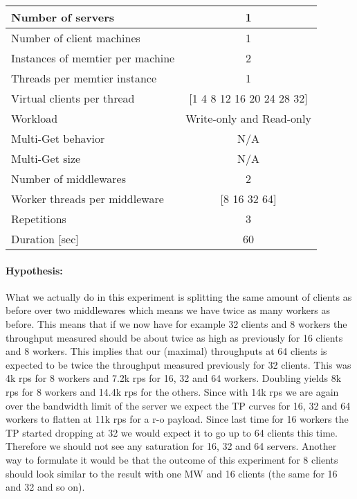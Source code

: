\documentclass[11pt,a4paper]{article}
\begin{document}
\begin{table}[!ht]
\begin{center}
	\scriptsize{
		\begin{tabular}{|l|c|}
			\hline Number of servers                & 1                        \\ 
			\hline Number of client machines        & 1                        \\ 
			\hline Instances of memtier per machine & 2                        \\ 
			\hline Threads per memtier instance     & 1                        \\
			\hline Virtual clients per thread       & [1 4 8 12 16 20 24 28 32]                  \\ 
			\hline Workload                         & Write-only and Read-only \\
			\hline Multi-Get behavior               & N/A                      \\
			\hline Multi-Get size                   & N/A                      \\
			\hline Number of middlewares            & 2                        \\
			\hline Worker threads per middleware    & [8 16 32 64]                  \\
			\hline Repetitions                      & 3               \\ 
			\hline Duration [sec]                      & 60              \\
			\hline 
		\end{tabular}
	} 
\end{center}
\end{table}

\paragraph{Hypothesis:} What we actually do in this experiment is splitting the same amount of clients as before over two middlewares which means we have twice as many workers as before. This means that if we now have for example 32 clients and 8 workers the throughput measured should be about twice as high as previously for 16 clients and 8 workers. This implies that our (maximal) throughputs at 64 clients is expected to be twice the throughput measured previously for 32 clients. This was 4k rps for 8 workers and 7.2k rps for 16, 32 and 64 workers. Doubling yields 8k rps for 8 workers and 14.4k rps for the others. Since with 14k rps we are again over the bandwidth limit of the server we expect the TP curves for 16, 32 and 64 workers to flatten at 11k rps for a r-o payload. Since last time for 16 workers the TP started dropping at 32 we would expect it to go up to 64 clients this time. Therefore we should not see any saturation for 16, 32 and 64 servers.
Another way to formulate it would be that the outcome of this experiment for 8 clients should look similar to the result with one MW and 16 clients (the same for 16 and 32 and so on).
\end{document}
